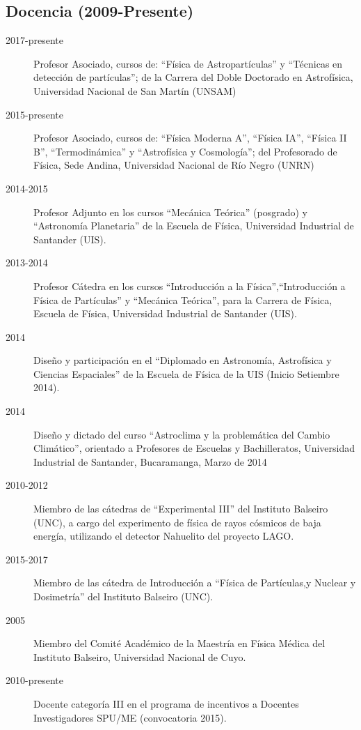 \subsection*{Docencia (2009-Presente)}
\begin{description}
	\item [2017-presente] Profesor Asociado, cursos de: ``Física de Astropartículas'' y ``Técnicas en detección de partículas''; de la Carrera del Doble Doctorado en Astrofísica, Universidad Nacional de San Martín (UNSAM)
	\item [2015-presente] Profesor Asociado, cursos de: ``Física Moderna A'', ``Física IA'', ``Física II B'', ``Termodinámica'' y ``Astrofísica y Cosmología''; del Profesorado de Física, Sede Andina, Universidad Nacional de Río Negro (UNRN)
	\item [2014-2015] Profesor Adjunto en los cursos ``Mecánica Teórica'' (posgrado) y ``Astronomía Planetaria'' de la Escuela de Física, Universidad Industrial de Santander (UIS).
	\item [2013-2014] Profesor Cátedra en los cursos ``Introducción a la Física'',``Introducción a Física de Partículas'' y ``Mecánica Teórica'', para la Carrera de Física, Escuela de Física, Universidad Industrial de Santander (UIS).
	\item [2014] Diseño y participación en el ``Diplomado en Astronomía, Astrofísica y Ciencias Espaciales'' de la Escuela de Física de la UIS (Inicio Setiembre 2014).
	\item [2014] Diseño y dictado del curso ``Astroclima y la problemática del Cambio Climático'', orientado a Profesores de Escuelas y Bachilleratos, Universidad Industrial de Santander, Bucaramanga, Marzo de 2014
	\item [2010-2012] Miembro de las cátedras de ``Experimental III'' del Instituto Balseiro (UNC), a cargo del experimento de física de rayos cósmicos de baja energía, utilizando el detector Nahuelito del proyecto LAGO.
	\item [2015-2017] Miembro de las cátedra de Introducción a ``Física de Partículas,y Nuclear y Dosimetría'' del Instituto Balseiro (UNC).
	\item [2005] Miembro del Comité Académico de la Maestría en Física Médica del Instituto Balseiro, Universidad Nacional de Cuyo.
	\item [2010-presente] Docente categoría III en el programa de incentivos a Docentes Investigadores SPU/ME (convocatoria 2015).
\end{description}
\fi
